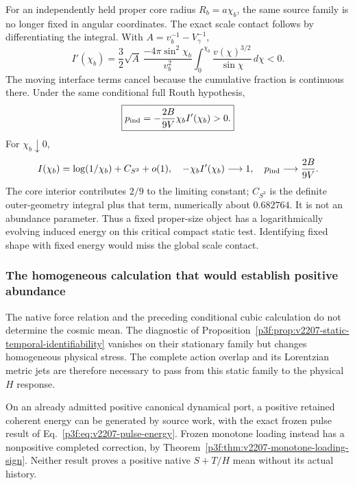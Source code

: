 \documentclass[12pt,a4paper]{article}
\begin{document}
For an independently held proper core radius $R_b=a\chi_b$, the same
source family is no longer fixed in angular coordinates. The exact scale
contact follows by differentiating the integral. With
$A=v_b^{-1}-V_\gamma^{-1}$,
\begin{equation}
\label{p8:eq:v2207-cubic-ball-scale-contact}
 \boxed{I'(\chi_b)=\frac32\sqrt A\,
       \frac{-4\pi\sin^2\chi_b}{v_b^2}
       \int_0^{\chi_b}\frac{v(\chi)^{3/2}}{\sin\chi}\,d\chi<0.}
\end{equation}
The moving interface terms cancel because the cumulative fraction is
continuous there. Under the same conditional full Routh hypothesis,
\begin{equation}
\label{p8:eq:v2207-cubic-ball-pressure}
 \boxed{p_{\rm ind}=-\frac{2B}{9V}\chi_bI'(\chi_b)>0.}
\end{equation}
For $\chi_b\downarrow0$,
\[
 I(\chi_b)=\log(1/\chi_b)+C_{S^3}+o(1),\quad
 -\chi_bI'(\chi_b)\longrightarrow1,\quad
 p_{\rm ind}\longrightarrow\frac{2B}{9V}.
\]
The core interior contributes $2/9$ to the limiting constant;
$C_{S^3}$ is the definite outer-geometry integral plus that term,
numerically about $0.682764$. It is not an abundance parameter.
Thus a fixed proper-size object has a logarithmically evolving induced
energy on this critical compact static test. Identifying fixed shape with
fixed energy would miss the global scale contact.

\subsubsection{The homogeneous calculation that would establish positive abundance}
\begin{proposition}
\label{p8:prop:v2207-static-h-closure-separation}
The native force relation and the preceding conditional cubic calculation
do not determine the cosmic mean. The diagnostic of
Proposition~\ref{p3f:prop:v2207-static-temporal-identifiability} vanishes
on their stationary family but changes homogeneous physical stress.
The complete action overlap and its Lorentzian metric jets are therefore
necessary to pass from this static family to the physical $H$ response.

On an already admitted positive canonical dynamical port, a positive
retained coherent energy can be generated by source work, with the exact
frozen pulse result of Eq.~\eqref{p3f:eq:v2207-pulse-energy}.
Frozen monotone loading instead has a nonpositive completed correction,
by Theorem~\ref{p3f:thm:v2207-monotone-loading-sign}. Neither result
proves a positive native $S+T/H$ mean without its actual history.
\end{proposition}
\end{document}

